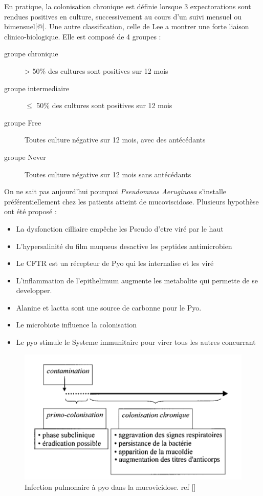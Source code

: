 \documentclass[12pt,a4paper]{article}
\begin{document}
En pratique, la colonisation chronique est définie lorsque 3 expectorations sont rendues positives en culture, successivement au cours d’un suivi mensuel ou bimensuel[@].
Une autre classification, celle de Lee a montrer une forte liaison clinico-biologique. Elle est composé de 4 groupes :  
\begin{description}
\item[groupe chronique] > 50\% des cultures sont positives sur 12 mois
\item[groupe intermediaire] $\leq$ 50\% des cultures sont positives sur  12 mois
\item[groupe Free] Toutes culture négative sur 12 mois, avec des antécédants
\item[groupe Never] Toutes culture négative sur 12 mois sans antécédants 
\end{description}

On ne sait pas aujourd’hui pourquoi \textit{Pseudomnas Aeruginosa} s’installe préférentiellement chez les patients atteint de mucoviscidose. Plusieurs hypothèse ont été proposé : 

\begin{itemize}
\item La dysfonction cilliaire empêche les Pseudo d’etre viré par le haut
\item L’hypersalinité du film muqueus desactive les peptides antimicrobien
\item Le CFTR est un récepteur de Pyo qui les internalise et les viré
\item L’inflammation de  l’epithelimum augmente les metabolite qui permette de se developper.
\item Alanine et lactta sont une source de carbonne pour le Pyo.
\item Le microbiote influence la colonisation
\item Le pyo stimule le Systeme immunitaire pour virer tous les autres concurrant 
\end{itemize}




\begin{figure}[ht]
\begin{center}
\includegraphics[scale=0.8]{img/chronic.png}\hfill
\end{center}
\caption{Infection pulmonaire à pyo dans la mucovicidose. ref []}
\label{bach}
\end{figure}
\end{document}
